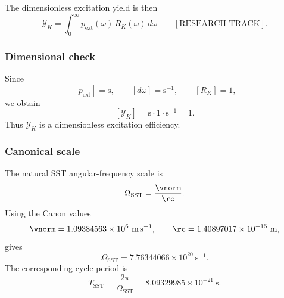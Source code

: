         The dimensionless excitation yield is then
        \begin{equation}
            \boxed{
                \mathcal{Y}_K
                =
                \int_0^\infty
                p_{\mathrm{ext}}(\omega)\,
                R_K(\omega)\,
                d\omega
            }
            \qquad
            [\mathrm{RESEARCH\text{-}TRACK}].
            \label{eq:SST_resonance_yield}
        \end{equation}
    
    \subsubsection*{Dimensional check}
        
        Since
        \[
            [p_{\mathrm{ext}}]=\mathrm{s},
            \qquad
            [d\omega]=\mathrm{s}^{-1},
            \qquad
            [R_K]=1,
        \]
        we obtain
        \[
            [\mathcal{Y}_K]
            =
            \mathrm{s}\cdot 1 \cdot \mathrm{s}^{-1}
            =
            1.
        \]
        Thus \(\mathcal{Y}_K\) is a dimensionless excitation efficiency.
    
    \subsubsection*{Canonical scale}
        
        The natural SST angular-frequency scale is
        \begin{equation}
            \Omega_{\mathrm{SST}}
            =
            \frac{\vnorm}{\rc}.
            \label{eq:Omega_SST_scale}
        \end{equation}
        Using the Canon values
        \[
            \vnorm = 1.09384563\times10^{6}\ \mathrm{m\,s^{-1}},
            \qquad
            \rc = 1.40897017\times10^{-15}\ \mathrm{m},
        \]
        gives
        \begin{equation}
            \Omega_{\mathrm{SST}}
            =
            7.76344066\times10^{20}\ \mathrm{s^{-1}}.
            \label{eq:Omega_SST_numeric}
        \end{equation}
        The corresponding cycle period is
        \begin{equation}
            T_{\mathrm{SST}}
            =
            \frac{2\pi}{\Omega_{\mathrm{SST}}}
            =
            8.09329985\times10^{-21}\ \mathrm{s}.
            \label{eq:T_SST_numeric}
        \end{equation}
    
